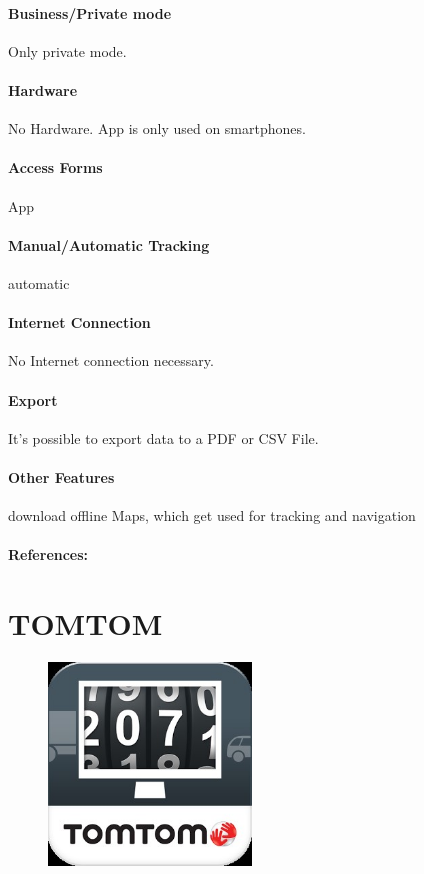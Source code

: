 \paragraph{Business/Private mode} Only private mode.
\paragraph{Hardware} No Hardware. App is only used on smartphones.
\paragraph{Access Forms} App
\paragraph{Manual/Automatic Tracking} automatic
\paragraph{Internet Connection} No Internet connection necessary.
\paragraph{Export} It’s possible to export data to a PDF or CSV File.
\paragraph{Other Features} download offline Maps, which get used for tracking and navigation
\paragraph{References:} \cite{osmand}
\newpage

\section{TOMTOM}
\begin{figure}
  \begin{center}
    \includegraphics[width=0.48\textwidth]{bilder/tomtom}
  \end{center}
\end{figure}
